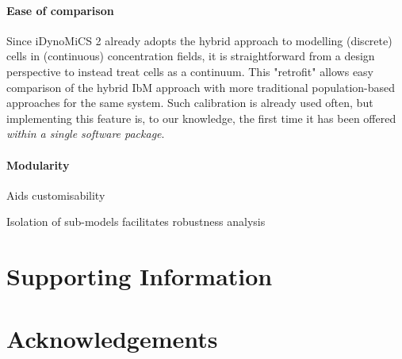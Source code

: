 \documentclass[10pt,letterpaper]{article}
\begin{document}
\paragraph{Ease of comparison}
Since iDynoMiCS 2 already adopts the hybrid approach to modelling (discrete) cells in (continuous) concentration fields, it is straightforward from a design perspective to instead treat cells as a continuum. This "retrofit" allows easy comparison of the hybrid IbM approach with more traditional population-based approaches \cite{wanner1986}
for the same system. Such calibration is already used often,
but implementing this feature is, to our knowledge, the first time it has been offered \textit{within a single software package}.

\paragraph{Modularity}
Aids customisability

Isolation of sub-models facilitates robustness analysis \cite{Grimm_robustness_2016, Wood_supersensitivity_1999}

\section*{Supporting Information}



\section*{Acknowledgements}

\nolinenumbers

%
%


\end{document}
